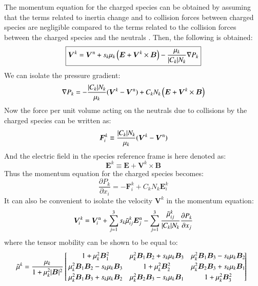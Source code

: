 \documentclass{warpdoc}
\newcommand\frameeqn[1]{\fbox{$\displaystyle #1$}}
\newcommand{\alb}{\vspace{0.1cm}\\} %
\newcommand{\mfd}{\displaystyle}
\renewcommand{\vec}[1]{\bm{#1}}
\begin{document}
The momentum equation for the charged species can be obtained by assuming that the terms related to inertia change and to collision forces between charged species are negligible compared to the terms related to the collision forces between the charged species and the neutrals \cite{jcp:2011:parent}. Then, the following is obtained: 
%
\begin{equation}
\frameeqn{
  \vec{V}^k=\vec{V}^{\rm n} + s_k \mu_k \left(\vec{E}+\vec{V}^k \times \vec{B}\right)-\frac{\mu_k}{|C_k| N_k}\nabla P_k
}
 \label{eqn:Vcharged}
\end{equation}
% 
We can isolate the pressure gradient:
%
\begin{equation}
\nabla P_k=
  -\frac{|C_k| N_k}{\mu_k}
(\vec{V}^k-\vec{V}^{\rm n})+C_k N_k \left(\vec{E}+\vec{V}^k \times \vec{B}\right)
\end{equation}
% 
Now the force per unit volume acting on the neutrals due to collisions by the charged species can be written as:
%
\begin{equation}
\vec{F}_i^k \equiv \frac{|C_k| N_k}{\mu_k} (\vec{V}^k-\vec{V}^{\rm n})
\end{equation}
%
And the electric field in the species reference frame is here denoted as:
%
\begin{equation}
\vec{E}^k \equiv \vec{E}+\vec{V}^k \times \vec{B}
\end{equation}
%
Thus the momentum equation for the charged species becomes:
%
\begin{equation}
  \frac{\partial P_k}{\partial x_i} = -\vec{F}_i^k + C_k N_k \vec{E}^k_i
 \label{eqn:nablaP}
\end{equation}
%
It can also be convenient to isolate the velocity $\vec{V}^k$ in the momentum equation: 
%
\begin{equation}
  \vec{V}^{k}_i = \vec{V}^{\rm n}_i+\sum_{j=1}^3 s_k \wtilde{\mu}^k_{ij}  \vec{E}_j^{\rm n}
             - \sum_{j=1}^3  \frac{\wtilde{\mu}^{k}_{ij}}{|C_k| N_k} \frac{\partial P_k}{\partial x_j}
  \label{eqn:V}
\end{equation}
%
where the tensor mobility can be shown to be equal to:
%
\begin{equation}
\!\!\!
\begin{array}{l}\mfd
\wtilde{\mu}^k  =\frac{\mu_k}{1+\mu_k^2|\vec{B}|^2}\left[\!\!\begin{array}{ccc} 
      1+\mu_k^2 \vec{B}_1^2 
     & \mu_k^2\vec{B}_1\vec{B}_2+s_k \mu_k \vec{B}_3  
     & \mu_k^2\vec{B}_1\vec{B}_3-s_k \mu_k \vec{B}_2 \alb
      \mu_k^2\vec{B}_1\vec{B}_2-s_k\mu_k\vec{B}_3 & 1+\mu_k^2\vec{B}_2^2 &  \mu_k^2\vec{B}_2\vec{B}_3+s_k\mu_k\vec{B}_1  \alb
      \mu_k^2\vec{B}_1\vec{B}_3 +s_k\mu_k\vec{B}_2 & \mu_k^2 \vec{B}_2\vec{B}_3-s_k\mu_k\vec{B}_1  & 1+\mu_k^2\vec{B}_3^2 
    \end{array} \!\!\!\!\right]
\end{array}
\label{eqn:mutilde}
\end{equation}
%
\end{document}
